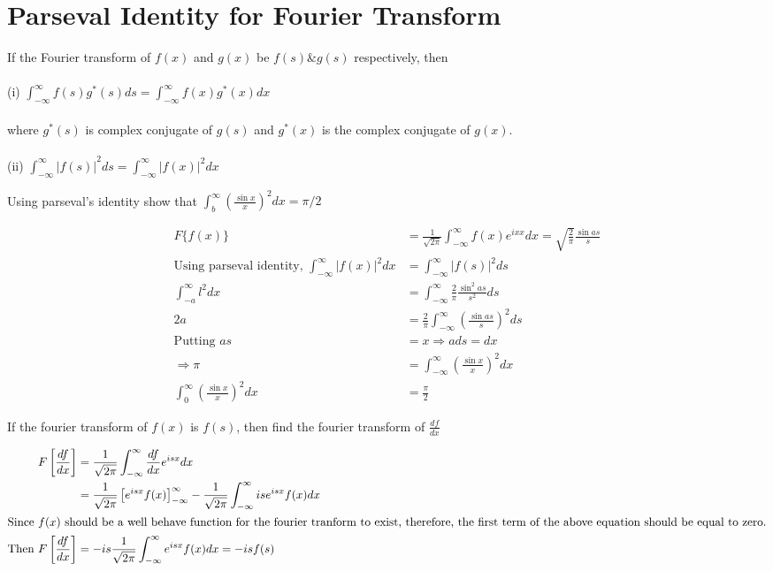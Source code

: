 \section{Parseval Identity for Fourier Transform}
If the Fourier transform of $f(x)$ and $g(x)$ be $f(s) \& g(s)$ respectively, then\\\\
(i) $\int_{-\infty}^{\infty} f(s) g^{*}(s) d s=\int_{-\infty}^{\infty} f(x) g^{*}(x) d x$\\\\
where $g^{*}(s)$ is complex conjugate of $g(s)$ and $g^{*}(x)$ is the complex conjugate of $g(x)$.\\\\
(ii) $\left.\int_{-\infty}^{\infty}|f(s)|\right.^{2} d s=\int_{-\infty}^{\infty}|f(x)|^{2} d x$
\begin{exercise}Using parseval's identity show that $\int_{b}^{\infty}\left(\frac{\sin x}{x}\right)^{2} d x=\pi / 2$
\end{exercise}
\begin{answer}
	\begin{align*}
	F\{f(x)\}&=\frac{1}{\sqrt{2 \pi}} \int_{-\infty}^{\infty} f(x) e^{i x x} d x=\sqrt{\frac{2}{\pi}} \frac{\sin a s}{s}\\
	\text{Using parseval identity, }\int_{-\infty}^{\infty}|f(x)|^{2} d x&=\int_{-\infty}^{\infty}|f(s)|^{2} d s\\
	\int_{-a}^{\infty} l^{2} d x&=\int_{-\infty}^{\infty} \frac{2}{\pi} \frac{\sin ^{2} a s}{s^{2}} d s \\ 2 a&=\frac{2}{\pi} \int_{-\infty}^{\infty}\left(\frac{\sin a s}{s}\right)^{2} d s\\
	\text{Putting }a s&=x \Rightarrow a d s=d x\\
	\Rightarrow \pi&=\int_{-\infty}^{\infty}\left(\frac{\sin x}{x}\right)^{2} d x \\ \int_{0}^{\infty}\left(\frac{\sin x}{x}\right)^{2} d x&=\frac{\pi}{2}
	\end{align*}
\end{answer}
\begin{exercise}
	If the fourier transform of $f(x)$ is $f(s)$, then find the fourier transform of $\frac{d f}{d x}$
\end{exercise}
\begin{answer}
	\begin{align*}
	F\left[\frac{d f}{d x}\right]&=\frac{1}{\sqrt{2 \pi}} \int_{-\infty}^{\infty} \frac{d f}{d x} e^{i s x} d x\\&=\frac{1}{\sqrt{2 \pi}}\left[e^{i s x} f(x)\right]_{-\infty}^{\infty}-\frac{1}{\sqrt{2 \pi}} \int_{-\infty}^{\infty} i s e^{i s x} f(x) d x\\
	\intertext{Since $f(x)$ should be a well behave function for the fourier tranform to exist, therefore, the first term of the above equation should be equal to zero.}
	\text{Then }F\left[\frac{d f}{d x}\right]&=-i s \frac{1}{\sqrt{2 \pi}} \int_{-\infty}^{\infty} e^{i s x} f(x) d x=-is f( {s})
	\end{align*}
\end{answer}
